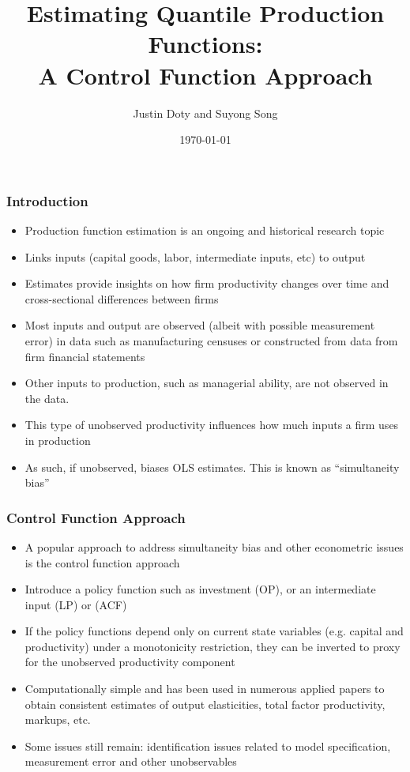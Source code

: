 \documentclass[xcolor={dvipsnames}, notheorems]{beamer}
\title[Quantile Production Functions]{Estimating Quantile Production Functions:\\
A Control Function Approach}
\author[Doty \& Song (2021)]{Justin Doty and Suyong Song} %
\institute[]{University of Iowa} %
{

\medskip %
}
\date{\today} %
\theoremstyle{plain}
\begin{document}
\begin{frame}
\titlepage %
\end{frame}


\begin{frame}
\frametitle{Introduction}
\begin{itemize}
\item Production function estimation is an ongoing and historical research topic
\item Links inputs (capital goods, labor, intermediate inputs, etc) to output
\item Estimates provide insights on how firm productivity changes over time and cross-sectional differences between firms
\item Most inputs and output are observed (albeit with possible measurement error) in data such as manufacturing censuses or constructed from data from firm financial statements
\item Other inputs to production, such as managerial ability, are not observed in the data. 
\item This type of unobserved productivity influences how much inputs a firm uses in production
\item As such, if unobserved, biases OLS estimates. This is known as ``simultaneity bias''
\end{itemize}
\end{frame}



\begin{frame}
\frametitle{Control Function Approach}
\begin{itemize}
\item A popular approach to address simultaneity bias and other econometric issues is the control function approach
\item Introduce a policy function such as investment \citep{Olley1996} (OP), or an intermediate input \citep{Levinsohn2003} (LP) or \citep{Ackerberg2015} (ACF)
\item If the policy functions depend only on current state variables (e.g. capital and productivity) under a monotonicity restriction, they can be inverted to proxy for the unobserved productivity component
\item  Computationally simple and has been used in numerous applied papers to obtain consistent estimates of output elasticities, total factor productivity, markups, etc.
\item Some issues still remain: identification issues related to model specification, measurement error and other unobservables
\end{itemize}
\end{frame}
\end{document}
